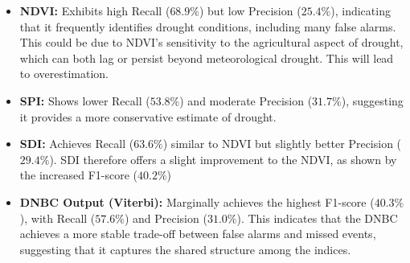 \begin{itemize}
    \item \textbf{NDVI:} Exhibits high Recall ($68.9\%$) but low Precision ($25.4\%$), indicating that it frequently identifies drought conditions, including many false alarms. This could be due to NDVI’s sensitivity to the agricultural aspect of drought, which can both lag or persist beyond meteorological drought. This will lead to overestimation.
    \item \textbf{SPI:} Shows lower Recall ($53.8\%$) and moderate Precision ($31.7\%$), suggesting it provides a more conservative estimate of drought.
    \item \textbf{SDI:} Achieves Recall ($63.6\%$) similar to NDVI but slightly better Precision ($29.4\%$). SDI therefore offers a slight improvement to the NDVI, as shown by the increased F1-score ($40.2\%$)
    \item \textbf{DNBC Output (Viterbi):} Marginally achieves the highest F1-score ($40.3\%$), with Recall ($57.6\%$) and Precision ($31.0\%$). This indicates that the DNBC achieves a more stable trade-off between false alarms and missed events, suggesting that it captures the shared structure among the indices. 
\end{itemize}






